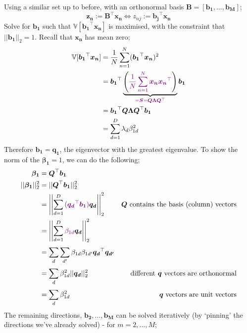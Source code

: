 \documentclass[a4paper, 12pt]{article}
\newcommand{\summation}[2]{\sum\limits_{#1}^{#2}}
\newcommand{\mat}[1]{\boldsymbol{#1}}
\newcommand{\violet}[1]{\textcolor{violet}{#1}}
\begin{document}
            Using a similar set up to before, with an orthonormal basis $\mat{B} = [\mat{b_1}, \dots, \mat{b_M}]$;
            $$\mat{z_n} := \mat{B}^\top\mat{x_n} \Leftrightarrow z_{nj} := \mat{b_j}^\top \mat{x_n}$$
            Solve for $\mat{b_1}$ such that $\mathbb{V}[\mat{b_1}^\top\mat{x_n}]$ is maximised, with the constraint that $|| \mat{b_1} ||_2 = 1$.
            Recall that $\mat{x_n}$ has mean zero;
            \begin{align*}
                \mathbb{V}[\mat{b_1}^\top\mat{x_n}] & = \frac{1}{N} \summation{n = 1}{N} (\mat{b_1}^\top\mat{x_n})^2 \\
                & = \mat{b_1}^\top \underbrace{\left( \violet{\frac{1}{N} \summation{n = 1}{N} \mat{x_n}\mat{x_n}^\top} \right)}_{\violet{= \mat{S} = \mat{Q}\mat{\Lambda}\mat{Q}^\top}} \mat{b_1} \\
                & = \mat{b_1}^\top \mat{Q}\mat{\Lambda}\mat{Q}^\top \mat{b_1} \\
                & = \summation{d = 1}{D} \lambda_d \beta_{1d}^2
            \end{align*}
            Therefore $\mat{b_1} = \mat{q_1}$, the eigenvector with the greatest eigenvalue.
            To show the norm of the $\mat{\beta_1} = 1$, we can do the following;
            \begin{align*}
                \mat{\beta_1} & = \mat{Q}^\top\mat{b_1} \\
                || \mat{\beta_1} ||_2^2 & = || \mat{Q}^\top\mat{b_1} ||_2^2 \\
                & = \left|\left| \summation{d = 1}{D} \violet{(\mat{q_d}^\top \mat{b_1})}\mat{q_d} \right|\right|_2^2 & \text{$\mat{Q}$ contains the basis (column) vectors} \\
                & = \left|\left| \summation{d = 1}{D} \violet{\beta_{1d}}\mat{q_d} \right|\right|_2^2 \\
                & = \summation{d}{} \summation{d^\prime}{} \beta_{1d}\beta_{1d^\prime} \mat{q_d}^\top \mat{q_{d^\prime}} \\
                & = \summation{d}{} \beta_{1d}^2 || \mat{q_d} ||_2^2 & \text{different $\mat{q}$ vectors are orthonormal} \\
                & = \summation{d}{} \beta_{1d}^2 & \text{$\mat{q}$ vectors are unit vectors}
            \end{align*}
            The remaining directions, $\mat{b_2}, \dots, \mat{b_M}$ can be solved iteratively (by `pinning' the directions we've already solved) - for $m = 2, \dots, M$;
\end{document}
